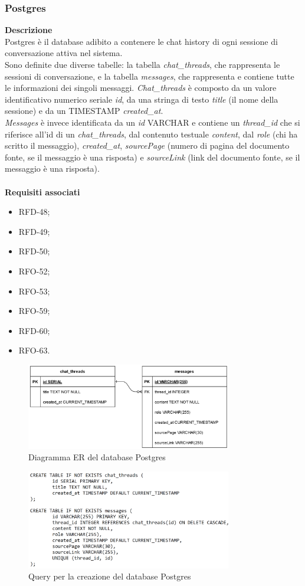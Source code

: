 \subsubsection{Postgres}
\textbf{Descrizione}\\
Postgres è il database adibito a contenere le chat history di ogni sessione di conversazione attiva nel sistema.\\
Sono definite due diverse tabelle: la tabella \textit{chat\_threads}, che rappresenta le sessioni di conversazione, e la tabella \textit{messages}, che rappresenta e contiene tutte le informazioni dei singoli messaggi.
\textit{Chat\_threads} è composto da un valore identificativo numerico seriale \textit{id}, da una stringa di testo \textit{title} (il nome della sessione) e da un TIMESTAMP \textit{created\_at}.\\
\textit{Messages} è invece identificata da un \textit{id} VARCHAR e contiene un \textit{thread\_id} che si riferisce all'id di un \textit{chat\_threads}, dal contenuto testuale \textit{content}, dal \textit{role} (chi ha scritto il messaggio), \textit{created\_at}, \textit{sourcePage} (numero di pagina del documento fonte, se il messaggio è una risposta) e \textit{sourceLink} (link del documento fonte, se il messaggio è una risposta).\\ \\
\textbf{Requisiti associati}
\begin{itemize}[itemsep=-4pt]
    \item RFD-48;
    \item RFD-49;
    \item RFD-50;
    \item RFO-52;
    \item RFO-53;
    \item RFO-59;
    \item RFD-60;
    \item RFO-63.
\end{itemize}


\begin{figure}[h!]
    \centering  
    \includegraphics[width=0.8\textwidth]{postgresdb.png}
    \caption{Diagramma ER del database Postgres}
\end{figure}

\begin{figure}[h!]
    \centering  
    \includegraphics[width=0.8\textwidth]{querypostgresdb.png}
    \caption{Query per la creazione del database Postgres}
\end{figure}

\newpage

